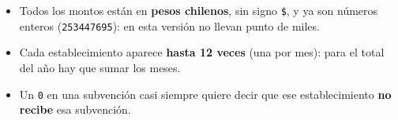 \documentclass[10.5pt]{article}
\begin{document}
\begin{alertabox}
\begin{itemize}[leftmargin=1.1em,itemsep=2pt,topsep=2pt]
\item Todos los montos están en \textbf{pesos chilenos}, sin signo \texttt{\$}, y ya son números enteros (\texttt{253447695}): en esta versión no llevan punto de miles.
\item Cada establecimiento aparece \textbf{hasta 12 veces} (una por mes): para el total del año hay que sumar los meses.
\item Un \texttt{0} en una subvención casi siempre quiere decir que ese establecimiento \textbf{no recibe} esa subvención.
\end{itemize}
\end{alertabox}

\newpage
{}\label{base7}\hypertarget{base7}{}
\end{document}
